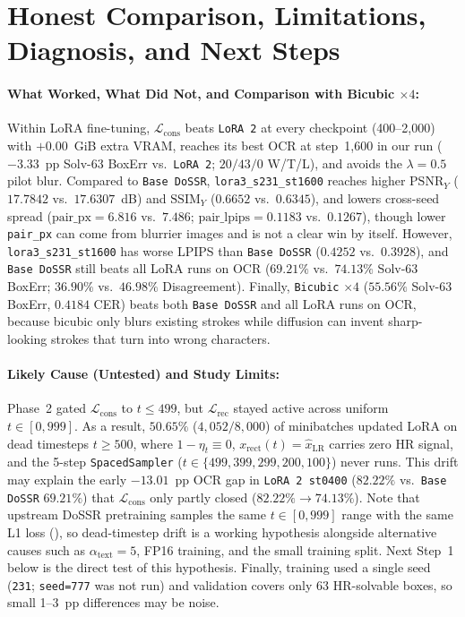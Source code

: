 \documentclass[11pt]{article}
\begin{document}
\section{Honest Comparison, Limitations, Diagnosis, and Next Steps}
\paragraph{What Worked, What Did Not, and Comparison with Bicubic $\times 4$:} Within LoRA fine-tuning, $\mathcal{L}_{\text{cons}}$ beats \texttt{LoRA~2} at every checkpoint (400--2,000) with $+0.00$~GiB extra VRAM, reaches its best OCR at step~1,600 in our run ($-3.33$~pp Solv-63 BoxErr vs.\ \texttt{LoRA~2}; $20/43/0$ W/T/L), and avoids the $\lambda=0.5$ pilot blur. Compared to \texttt{Base DoSSR}, \texttt{lora3\_s231\_st1600} reaches higher $\text{PSNR}_Y$ ($17.7842$ vs.\ $17.6307$~dB) and $\text{SSIM}_Y$ ($0.6652$ vs.\ $0.6345$), and lowers cross-seed spread ($\text{pair\_px} = 6.816$ vs.\ $7.486$; $\text{pair\_lpips} = 0.1183$ vs.\ $0.1267$), though lower \texttt{pair\_px} can come from blurrier images and is not a clear win by itself. However, \texttt{lora3\_s231\_st1600} has worse LPIPS than \texttt{Base DoSSR} ($0.4252$ vs.\ $0.3928$), and \texttt{Base DoSSR} still beats all LoRA runs on OCR ($69.21\%$ vs.\ $74.13\%$ Solv-63 BoxErr; $36.90\%$ vs.\ $46.98\%$ Disagreement). Finally, \texttt{Bicubic} $\times 4$ ($55.56\%$ Solv-63 BoxErr, $0.4184$ CER) beats both \texttt{Base DoSSR} and all LoRA runs on OCR, because bicubic only blurs existing strokes while diffusion can invent sharp-looking strokes that turn into wrong characters.

\paragraph{Likely Cause (Untested) and Study Limits:} Phase~2 gated $\mathcal{L}_{\text{cons}}$ to $t \le 499$, but $\mathcal{L}_{\text{rec}}$ stayed active across uniform $t \in [0, 999]$. As a result, $50.65\%$ ($4{,}052 / 8{,}000$) of minibatches updated LoRA on dead timesteps $t \ge 500$, where $1 - \eta_t \equiv 0$, $x_{\text{rect}}(t) = \hat{x}_{\text{LR}}$ carries zero HR signal, and the 5-step \texttt{SpacedSampler} ($t \in \{499, 399, 299, 200, 100\}$) never runs. This drift may explain the early $-13.01$~pp OCR gap in \texttt{LoRA~2 st0400} ($82.22\%$ vs.\ \texttt{Base DoSSR} $69.21\%$) that $\mathcal{L}_{\text{cons}}$ only partly closed ($82.22\% \to 74.13\%$). Note that upstream DoSSR pretraining samples the same $t \in [0, 999]$ range with the same L1 loss (), so dead-timestep drift is a working hypothesis alongside alternative causes such as $\alpha_{\text{text}}=5$, FP16 training, and the small training split. Next Step~1 below is the direct test of this hypothesis. Finally, training used a single seed (\texttt{231}; \texttt{seed=777} was not run) and validation covers only 63 HR-solvable boxes, so small 1--3~pp differences may be noise.
\end{document}
